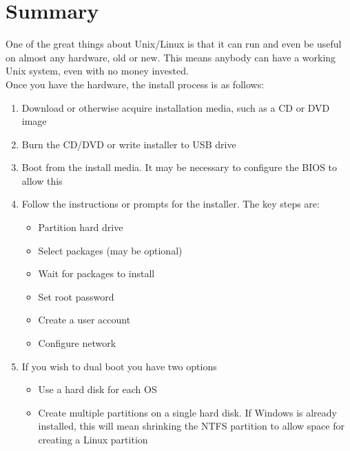\section*{Summary}

One of the great things about Unix/Linux is that it can run and even be useful on almost any hardware, old or new.  This means anybody can have a working Unix system, even with no money invested.\\

Once you have the hardware, the install process is as follows:\\

\begin{enumerate}
\item Download or otherwise acquire installation media, such as a CD or DVD image
\item Burn the CD/DVD or write installer to USB drive
\item Boot from the install media.  It may be necessary to configure the BIOS to allow this
\item Follow the instructions or prompts for the installer.  The key steps are:
   \begin{itemize}
   \item Partition hard drive
   \item Select packages (may be optional)
   \item Wait for packages to install
   \item Set root password
   \item Create a user account
   \item Configure network
   \end{itemize}
\item If you wish to dual boot you have two options
   \begin{itemize}
   \item Use a hard disk for each OS
   \item Create multiple partitions on a single hard disk. If Windows is already installed, this will mean shrinking the NTFS partition to allow space for creating a Linux partition
   \end{itemize}
\end{enumerate}
